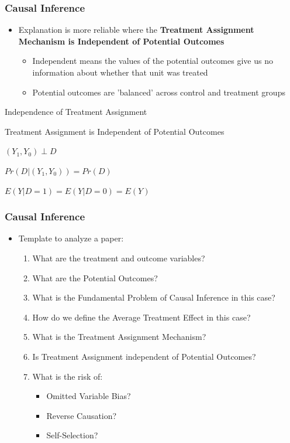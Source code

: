 \documentclass[xcolor=x11names,compress]{beamer}\usepackage[]{graphicx}\usepackage[]{color}
\renewcommand{\(}{\begin{columns}}
\renewcommand{\)}{\end{columns}}
\newcommand{\<}[1]{\begin{column}{#1}}
\renewcommand{\>}{\end{column}}
\begin{document}
\begin{frame}
\frametitle{Causal Inference}
\begin{itemize}
\item Explanation is more reliable where the \textbf{Treatment Assignment Mechanism is Independent of Potential Outcomes}
\pause
\begin{itemize}
\item Independent means the values of the potential outcomes give us no information about whether that unit was treated
\pause
\item Potential outcomes are 'balanced' across control and treatment groups
\end{itemize}
\end{itemize}
\begin{block}{Independence of Treatment Assignment}
\item Treatment Assignment is Independent of Potential Outcomes
\pause 
\item $(Y_1,Y_0) \perp D$
\pause
\item $Pr(D|(Y_1,Y_0)) = Pr(D)$
\pause
\item $E(Y|D=1) = E(Y|D=0) = E(Y)$
\end{block}
\end{frame}

\begin{frame}
\frametitle{Causal Inference}
\begin{itemize}
\item Template to analyze a paper:
\begin{enumerate}
\item What are the treatment and outcome variables?
\pause
\item What are the Potential Outcomes?
\pause
\item What is the Fundamental Problem of Causal Inference in this case?
\pause
\item How do we define the Average Treatment Effect in this case?
\pause
\item What is the Treatment Assignment Mechanism?
\pause
\item Is Treatment Assignment independent of Potential Outcomes?
\pause
\item What is the risk of:
\begin{itemize}
\item Omitted Variable Bias?
\pause
\item Reverse Causation?
\pause
\item Self-Selection?
\end{itemize}
\end{enumerate}
\end{itemize}
\end{frame}
\end{document}
